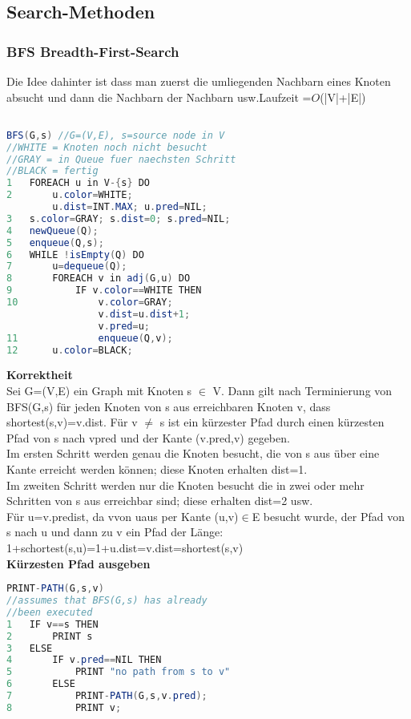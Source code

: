 \documentclass[jou,apacite]{apa6}
\begin{document}
\subsection{Search-Methoden}
\subsubsection{BFS Breadth-First-Search}
Die Idee dahinter ist dass man zuerst die umliegenden Nachbarn eines Knoten absucht und dann die Nachbarn der Nachbarn usw.Laufzeit =$O$(|V|+|E|)
\begin{lstlisting}[language=java]

BFS(G,s) //G=(V,E), s=source node in V
//WHITE = Knoten noch nicht besucht
//GRAY = in Queue fuer naechsten Schritt
//BLACK = fertig
1   FOREACH u in V-{s} DO
2       u.color=WHITE; 
        u.dist=INT.MAX; u.pred=NIL;
3   s.color=GRAY; s.dist=0; s.pred=NIL;
4   newQueue(Q);
5   enqueue(Q,s);
6   WHILE !isEmpty(Q) DO
7       u=dequeue(Q);
8       FOREACH v in adj(G,u) DO 
9           IF v.color==WHITE THEN
10              v.color=GRAY; 
                v.dist=u.dist+1;
                v.pred=u;
11              enqueue(Q,v);
12      u.color=BLACK;

\end{lstlisting}
{\bfseries Korrektheit }\\
Sei G=(V,E) ein Graph mit Knoten s $\in$ V. Dann gilt nach Terminierung von BFS(G,s) für jeden Knoten
von s aus erreichbaren Knoten v, dass shortest(s,v)=v.dist. Für v $\neq$ s ist ein kürzester Pfad durch einen kürzesten Pfad von s nach vpred und der Kante (v.pred,v) gegeben. \\
Im ersten Schritt werden genau  die Knoten besucht,  die von s aus über eine Kante erreicht werden können; diese Knoten erhalten dist=1.\\
Im zweiten Schritt werden nur die Knoten besucht die in zwei oder mehr Schritten von s aus erreichbar sind; diese erhalten dist=2 usw. \\
Für u=v.predist, da vvon uaus per Kante (u,v)$\in$E besucht wurde, der Pfad von s nach u und dann zu v ein Pfad der Länge: \\
1+schortest(s,u)=1+u.dist=v.dist=shortest(s,v)\\
{\bfseries Kürzesten Pfad ausgeben}
\begin{lstlisting}[language=java]
PRINT-PATH(G,s,v)
//assumes that BFS(G,s) has already 
//been executed
1   IF v==s THEN
2       PRINT s
3   ELSE
4       IF v.pred==NIL THEN
5           PRINT "no path from s to v"
6       ELSE
7           PRINT-PATH(G,s,v.pred);
8           PRINT v;
\end{lstlisting}
\end{document}
